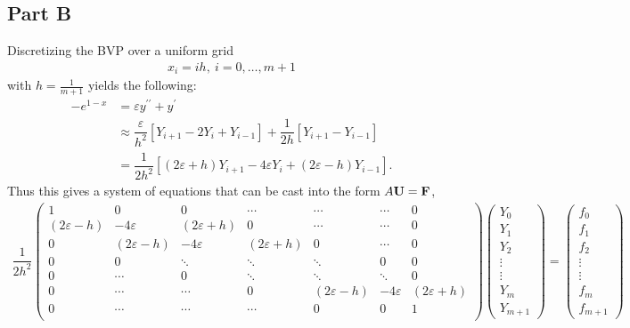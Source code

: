 \documentclass[12pt]{article}
\begin{document}
\subsection*{Part B}
Discretizing the BVP over a uniform grid
\begin{align}
    x_{i} = ih,\ i = 0, \dots, m+1
\end{align}
with $h = \frac{1}{m+1}$ yields the following:
\begin{subequations}
    \begin{align}
        -e^{1-x} &= \varepsilon y^{\prime\prime} + y^{\prime} \\
        &\approx \dfrac{\varepsilon}{h^{2}}\left[Y_{i+1}-2Y_{i}+Y_{i-1}\right] + \dfrac{1}{2h}\left[Y_{i+1}-Y_{i-1}\right]\\
        &= \dfrac{1}{2h^{2}}\left[(2\varepsilon+h)Y_{i+1}-4\varepsilon Y_{i} + (2\varepsilon-h)Y_{i-1}\right].
    \end{align}
\end{subequations}
Thus this gives a system of equations that can be cast into the form $A\vb{U} = \vb{F}$,
\begin{align}
    \dfrac{1}{2h^{2}}
    \begin{pmatrix}
    1 & 0 & 0 & \cdots & \cdots & \cdots & 0\\
    (2\varepsilon - h) & -4\varepsilon & (2\varepsilon + h) & 0 & \cdots & \cdots &0 \\
    0 & (2\varepsilon - h) & -4\varepsilon & (2\varepsilon + h) & 0 & \cdots & 0 \\
    0 & 0 & \ddots & \ddots & \ddots & 0 & 0 \\
    0 & \cdots & 0 & \ddots & \ddots & \ddots & 0  \\
    0 & \cdots & \cdots & 0 & (2\varepsilon - h) & -4\varepsilon & (2\varepsilon + h)\\
    0 & \cdots & \cdots & \cdots & 0 & 0 & 1\\
    \end{pmatrix}
    \begin{pmatrix}
    Y_{0} \\ Y_{1} \\ Y_{2} \\ \vdots \\ \vdots \\ Y_{m} \\ Y_{m+1}
    \end{pmatrix}
    =
    \begin{pmatrix}
    f_{0} \\ f_{1} \\ f_{2} \\ \vdots \\ \vdots \\ f_{m} \\ f_{m+1}
    \end{pmatrix}
\end{align}
\end{document}
